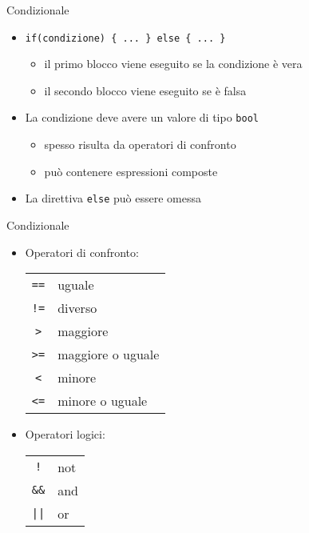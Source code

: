 \begin{frame}[fragile]{Condizionale}
  \vfill
  \begin{itemize}
    \item \lstinline$if(condizione) { ... } else { ... }$
    \begin{itemize}
      \item il primo blocco viene eseguito se la condizione è vera
      \item il secondo blocco viene eseguito se è falsa
    \end{itemize}
    \vfill
    \item La condizione deve avere un valore di tipo \lstinline$bool$
    \begin{itemize}
      \item spesso risulta da operatori di \alert{confronto}
      \item può contenere espressioni composte
    \end{itemize}
    \vfill
    \item La direttiva \lstinline$else$ può essere omessa
  \end{itemize}
  \vfill
\end{frame}

\begin{frame}[fragile]{Condizionale}
  \vfill
  \begin{itemize}
    \item Operatori di confronto:\\[.5em]
    \hspace{5mm}\begin{tabular}{cl}
      \lstinline$==$ & uguale \\
      \lstinline$!=$ & diverso \\
      \lstinline$>$ & maggiore \\
      \lstinline$>=$ & maggiore o uguale \\
      \lstinline$<$ & minore \\
      \lstinline$<=$ & minore o uguale \\
    \end{tabular}
    \vfill
    \item Operatori logici:\\[.5em]
    \hspace{5mm}\begin{tabular}{cl}
      \lstinline$!$ & not \\
      \lstinline$&&$ & and \\
      \lstinline$||$ & or \\
    \end{tabular}
  \end{itemize}
  \vfill
\end{frame}

